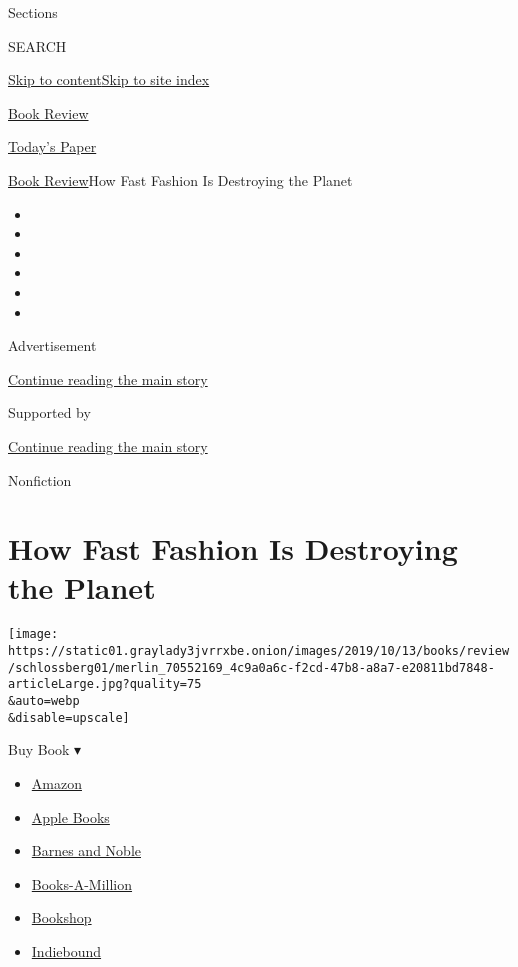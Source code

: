 Sections

SEARCH

\protect\hyperlink{site-content}{Skip to
content}\protect\hyperlink{site-index}{Skip to site index}

\href{https://www.nytimes3xbfgragh.onion/section/books/review}{Book
Review}

\href{https://myaccount.nytimes3xbfgragh.onion/auth/login?response_type=cookie\&client_id=vi}{}

\href{https://www.nytimes3xbfgragh.onion/section/todayspaper}{Today's
Paper}

\href{/section/books/review}{Book Review}\textbar{}How Fast Fashion Is
Destroying the Planet

\begin{itemize}
\item
\item
\item
\item
\item
\item
\end{itemize}

Advertisement

\protect\hyperlink{after-top}{Continue reading the main story}

Supported by

\protect\hyperlink{after-sponsor}{Continue reading the main story}

Nonfiction

\hypertarget{how-fast-fashion-is-destroying-the-planet}{%
\section{How Fast Fashion Is Destroying the
Planet}\label{how-fast-fashion-is-destroying-the-planet}}

\texttt{[image: https://static01.graylady3jvrrxbe.onion/images/2019/10/13/books/review/schlossberg01/merlin\_70552169\_4c9a0a6c-f2cd-47b8-a8a7-e20811bd7848-articleLarge.jpg?quality=75\\\&auto=webp\\\&disable=upscale]}

Buy Book ▾

\begin{itemize}
\tightlist
\item
  \href{https://www.amazon.com/gp/search?index=books\&tag=NYTBSREV-20\&field-keywords=Fashionopolis+Dana+Thomas}{Amazon}
\item
  \href{https://du-gae-books-dot-nyt-du-prd.appspot.com/buy?title=Fashionopolis\&author=Dana+Thomas}{Apple
  Books}
\item
  \href{https://www.anrdoezrs.net/click-7990613-11819508?url=https\%3A\%2F\%2Fwww.barnesandnoble.com\%2Fw\%2F\%3Fean\%3D9780735224018}{Barnes
  and Noble}
\item
  \href{https://www.anrdoezrs.net/click-7990613-35140?url=https\%3A\%2F\%2Fwww.booksamillion.com\%2Fp\%2FFashionopolis\%2FDana\%2BThomas\%2F9780735224018}{Books-A-Million}
\item
  \href{https://bookshop.org/a/3546/9780735224018}{Bookshop}
\item
  \href{https://www.indiebound.org/book/9780735224018?aff=NYT}{Indiebound}
\end{itemize}

